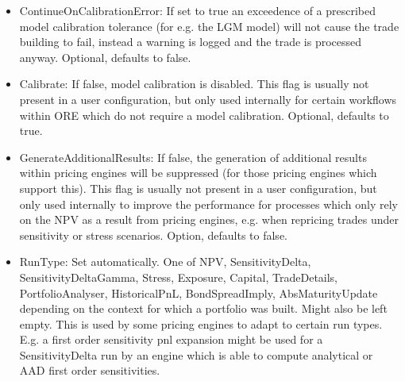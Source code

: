 \begin{itemize}
\item ContinueOnCalibrationError: If set to true an exceedence of a prescribed model calibration tolerance (for e.g. the
  LGM model) will not cause the trade building to fail, instead a warning is logged and the trade is processed
  anyway. Optional, defaults to false.
\item Calibrate: If false, model calibration is disabled. This flag is usually not present in a user configuration, but
  only used internally for certain workflows within ORE which do not require a model calibration. Optional, defaults to
  true.
\item GenerateAdditionalResults: If false, the generation of additional results within pricing engines will be
  suppressed (for those pricing engines which support this). This flag is usually not present in a user configuration,
  but only used internally to improve the performance for processes which only rely on the NPV as a result from pricing
  engines, e.g. when repricing trades under sensitivity or stress scenarios. Option, defaults to false.
\item RunType: Set automatically. One of NPV, SensitivityDelta, SensitivityDeltaGamma, Stress, Exposure, Capital,
  TradeDetails, PortfolioAnalyser, HistoricalPnL, BondSpreadImply, AbsMaturityUpdate depending on the context for which
  a portfolio was built. Might also be left empty. This is used by some pricing engines to adapt to certain run
  types. E.g. a first order sensitivity pnl expansion might be used for a SensitivityDelta run by an engine which is
  able to compute analytical or AAD first order sensitivities.
\end{itemize}
